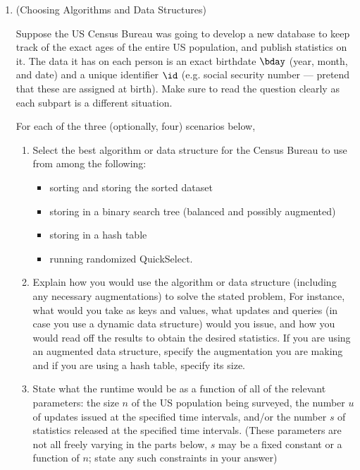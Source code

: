 \documentclass[11pt]{article}
\begin{document}
\begin{enumerate}

\item (Choosing Algorithms and Data Structures)

Suppose the US Census Bureau was going to develop a new database to keep track of the exact ages of the entire US population, and publish statistics on it.  The data it has on each person is an exact birthdate
$\bday$ (year, month, and date) and a unique identifier $\id$ (e.g. social security number --- pretend that these are assigned at birth). Make sure to read the question clearly as each subpart is a different situation.

For each of the three (optionally, four) scenarios below,

\begin{enumerate}[label=(\roman*)]
\item Select the best algorithm or data structure for the Census Bureau to use from among the following:
\begin{itemize}
\item sorting and storing the sorted dataset
\item storing in a binary search tree (balanced and possibly augmented)
\item storing in a hash table
\item running randomized QuickSelect.
\end{itemize}

\item Explain how you would use the
algorithm or data structure (including any necessary augmentations) to solve the stated problem, For instance, what would you take as keys and values, what updates and queries (in case you use a dynamic data structure) would you issue, and how you would read off the results to obtain the desired statistics. If you are using an augmented data structure, specify the augmentation you are making and if you are using a hash table, specify its size.

\item State what the runtime would be as a function of all of the relevant parameters: the size $n$ of the US population being surveyed, the number $u$ of updates issued at the specified time intervals, and/or the number $s$ of statistics released at the specified time intervals. (These parameters are not all freely varying in the parts below, $s$ may be a fixed constant or a function of $n$; state any such constraints in your answer)
\end{enumerate}


\end{enumerate}
\end{document}
